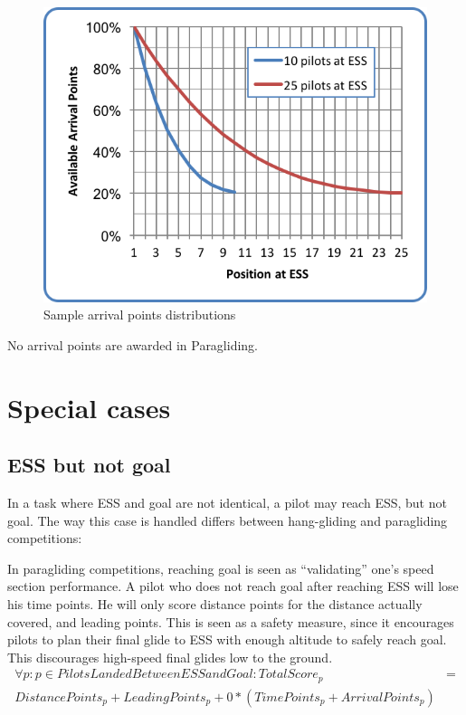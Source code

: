 \documentclass{article}
\begin{document}
\begin{figure}[h]
    \centering
    \includegraphics[scale=0.8]{img/arrival-points.png}
    \caption{Sample arrival points distributions}
\end{figure}

\begin{pg}
No arrival points are awarded in Paragliding.
\end{pg}

\newpage
\section{Special cases}
\label{sec:special-cases}
\subsection{ESS but not goal}
In a task where ESS and goal are not identical, a pilot may reach ESS, but not
goal. The way this case is handled differs between hang-gliding and paragliding
competitions:

\begin{pg}
In paragliding competitions, reaching goal is seen as “validating” one’s speed
section performance. A pilot who does not reach goal after reaching ESS will
lose his time points. He will only score distance points for the distance
actually covered, and leading points. This is seen as a safety measure, since
it encourages pilots to plan their final glide to ESS with enough altitude to
safely reach goal. This discourages high-speed final glides low to the ground.
\begin{align*}
    \forall p : p \in PilotsLandedBetweenESSandGoal : TotalScore_p &= \\
    DistancePoints_p + LeadingPoints_p + 0 * (TimePoints_p + ArrivalPoints_p)
\end{align*}
\end{pg}
\end{document}
